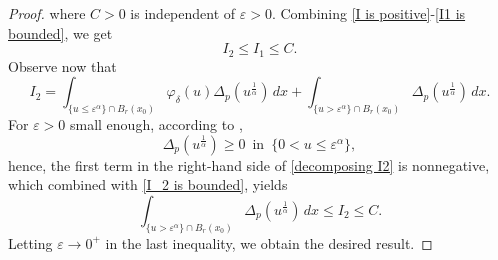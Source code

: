 \documentclass[10pt,a4paper]{amsart}
\begin{document}
\begin{proof}
    where $C>0$ is independent of $\varepsilon>0$.
    Combining \eqref{I is positive}-\eqref{I1 is bounded}, we get
    \begin{equation}\label{I_2 is bounded}
        I_2\le I_1\le C.
    \end{equation}
    Observe now that
    \begin{equation}\label{decomposing I2}
        I_2=\int_{\{u\le\varepsilon^\alpha\}\cap B_r(x_0)}\varphi_\delta(u)\Delta_p(u^{\frac{1}{\alpha}})\,dx+\int_{\{u>\varepsilon^\alpha\}\cap B_r(x_0)}\Delta_p(u^{\frac{1}{\alpha}})\,dx.
    \end{equation}
    For $\varepsilon>0$ small enough, according to ,
    $$
    \Delta_p(u^{\frac{1}{\alpha}})\ge0\,\,\,\text{in}\,\,\, \{0<u\le\varepsilon^\alpha\},
    $$
    hence, the first term in the right-hand side of \eqref{decomposing I2} is nonnegative, which combined with \eqref{I_2 is bounded}, yields
    $$
    \int_{\{u>\varepsilon^\alpha\}\cap B_r(x_0)}\Delta_p(u^{\frac{1}{\alpha}})\,dx\le I_2\le C.
    $$
    Letting $\varepsilon\to0^+$ in the last inequality, we obtain the desired result.
\end{proof}
\end{document}
